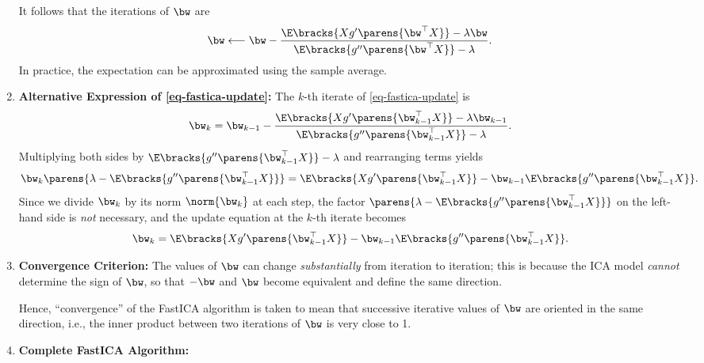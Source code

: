 \documentclass[12pt]{article}
\begin{document}
\begin{enumerate}[label=\textbf{\arabic*.}]
	It follows that the iterations of $\bw$ are 
	\begin{align}\label{eq-fastica-update}
		\bw \longleftarrow \bw - \frac{\E \bracks{X g' \parens{\bw^\top X}} - \lambda \bw}{\E \bracks{ g'' \parens{\bw^\top X}} - \lambda}. 
	\end{align}
	In practice, the expectation can be approximated using the sample average. 
	
	\item \textbf{Alternative Expression of \eqref{eq-fastica-update}:} The $k$-th iterate of \eqref{eq-fastica-update} is 
	\begin{align*}
		\bw_k = \bw_{k-1} - \frac{\E \bracks{X g' \parens{\bw_{k-1}^\top X}} - \lambda \bw_{k-1}}{\E \bracks{ g'' \parens{\bw_{k-1}^\top X}} - \lambda}. 
	\end{align*}
	Multiplying both sides by $\E \bracks{ g'' \parens{\bw_{k-1}^\top X}} - \lambda$ and rearranging terms yields 
	\begin{align*}
		\bw_k \parens{\lambda - \E \bracks{ g'' \parens{\bw_{k-1}^\top X}}} = \E \bracks{X g' \parens{\bw_{k-1}^\top X}} - \bw_{k-1} \E \bracks{ g'' \parens{\bw_{k-1}^\top X}}. 
	\end{align*}
	Since we divide $\bw_k$ by its norm $\norm{\bw_k}$ at each step, the factor $\parens{\lambda - \E \bracks{ g'' \parens{\bw_{k-1}^\top X}}}$ on the left-hand side is \emph{not} necessary, and the update equation at the $k$-th iterate becomes 
	\begin{align*}
		\bw_k = \E \bracks{X g' \parens{\bw_{k-1}^\top X}} - \bw_{k-1} \E \bracks{ g'' \parens{\bw_{k-1}^\top X}}. 
	\end{align*}
	
	\item \textbf{Convergence Criterion:} The values of $\bw$ can change \emph{substantially} from iteration to iteration; this is because the ICA model \emph{cannot} determine the sign of $\bw$, so that $-\bw$ and $\bw$ become equivalent and define the same direction. 
	
	Hence, ``convergence'' of the FastICA algorithm is taken to mean that successive iterative values of $\bw$ are oriented in the same direction, i.e., the inner product between two iterations of $\bw$ is very close to 1. 
	
	\item \textbf{Complete FastICA Algorithm:}
	

\end{enumerate}
\end{document}
